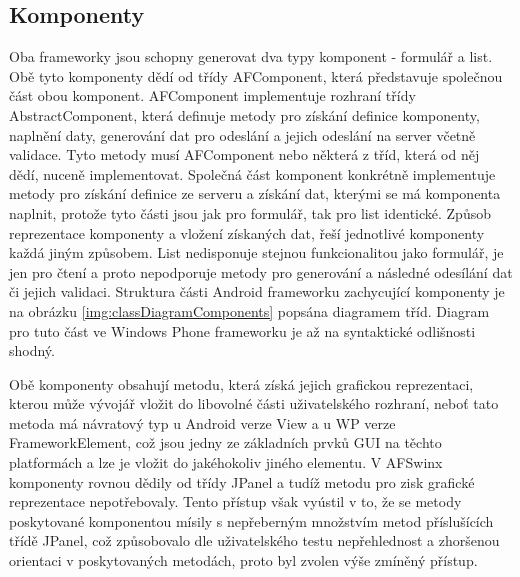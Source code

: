 \subsection{Komponenty}
Oba frameworky jsou schopny generovat dva typy komponent - formulář a list. Obě tyto komponenty dědí od třídy AFComponent, která představuje společnou část obou komponent. AFComponent implementuje rozhraní třídy AbstractComponent, která definuje metody pro získání definice komponenty, naplnění daty, generování dat pro odeslání a jejich odeslání na server včetně validace. Tyto metody musí AFComponent nebo některá z tříd, která od něj dědí, nuceně implementovat. Společná část komponent konkrétně implementuje metody pro získání definice ze serveru a získání dat, kterými se má komponenta naplnit, protože tyto části jsou jak pro formulář, tak pro list identické. Způsob reprezentace komponenty a vložení získaných dat, řeší jednotlivé komponenty každá jiným způsobem. List nedisponuje stejnou funkcionalitou jako formulář, je jen pro čtení a proto nepodporuje metody pro generování a následné odesílání dat či jejich validaci. Struktura části Android frameworku zachycující komponenty je na obrázku \ref{img:classDiagramComponents} popsána diagramem tříd. Diagram pro tuto část ve Windows Phone frameworku je až na syntaktické odlišnosti shodný.  

Obě komponenty obsahují metodu, která získá jejich grafickou reprezentaci, kterou může vývojář vložit do libovolné části uživatelského rozhraní, neboť tato metoda má návratový typ u Android verze View a u WP verze FrameworkElement, což jsou jedny ze základních prvků GUI na těchto platformách a lze je vložit do jakéhokoliv jiného elementu. V AFSwinx \cite{tomasek-thesis} komponenty rovnou dědily od třídy JPanel a tudíž metodu pro zisk grafické reprezentace nepotřebovaly. Tento přístup však vyústil v to, že se metody poskytované komponentou mísily s nepřeberným množstvím metod příslušících třídě JPanel, což způsobovalo dle uživatelského testu nepřehlednost a zhoršenou orientaci v poskytovaných metodách, proto byl zvolen výše zmíněný přístup. 

